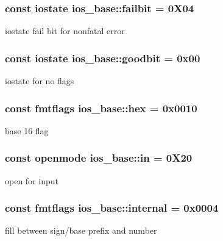 \subsubsection[{\texorpdfstring{failbit}{failbit}}]{\setlength{\rightskip}{0pt plus 5cm}const {\bf iostate} ios\+\_\+base\+::failbit = 0\+X04\hspace{0.3cm}{\ttfamily [static]}}\hypertarget{classios__base_a36157154001bcce17827db6786e35efd}{}\label{classios__base_a36157154001bcce17827db6786e35efd}
iostate fail bit for nonfatal error 
\subsubsection[{\texorpdfstring{goodbit}{goodbit}}]{\setlength{\rightskip}{0pt plus 5cm}const {\bf iostate} ios\+\_\+base\+::goodbit = 0x00\hspace{0.3cm}{\ttfamily [static]}}\hypertarget{classios__base_a07a00996a6e525b88bdfe7935d5ead05}{}\label{classios__base_a07a00996a6e525b88bdfe7935d5ead05}
iostate for no flags 
\subsubsection[{\texorpdfstring{hex}{hex}}]{\setlength{\rightskip}{0pt plus 5cm}const {\bf fmtflags} ios\+\_\+base\+::hex = 0x0010\hspace{0.3cm}{\ttfamily [static]}}\hypertarget{classios__base_a3608e51eb0a80ea94ddadd5b713a3750}{}\label{classios__base_a3608e51eb0a80ea94ddadd5b713a3750}
base 16 flag 
\subsubsection[{\texorpdfstring{in}{in}}]{\setlength{\rightskip}{0pt plus 5cm}const {\bf openmode} ios\+\_\+base\+::in = 0\+X20\hspace{0.3cm}{\ttfamily [static]}}\hypertarget{classios__base_ae5432e3c269064480652c4602f5f74ad}{}\label{classios__base_ae5432e3c269064480652c4602f5f74ad}
open for input 
\subsubsection[{\texorpdfstring{internal}{internal}}]{\setlength{\rightskip}{0pt plus 5cm}const {\bf fmtflags} ios\+\_\+base\+::internal = 0x0004\hspace{0.3cm}{\ttfamily [static]}}\hypertarget{classios__base_afc720b7f6f461ec8e9cf5505059e5d7c}{}\label{classios__base_afc720b7f6f461ec8e9cf5505059e5d7c}
fill between sign/base prefix and number 
